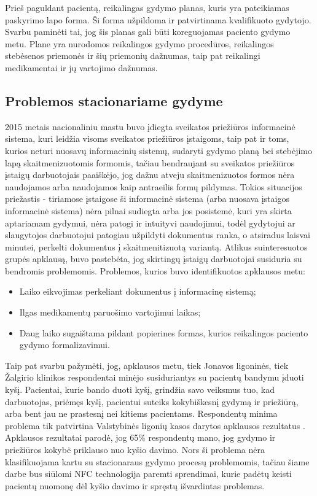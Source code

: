 Prieš paguldant pacientą, reikalingas gydymo planas, kuris yra pateikiamas paskyrimo lapo forma. Ši forma užpildoma ir patvirtinama kvalifikuoto gydytojo. Svarbu paminėti tai, jog šis planas gali būti koreguojamas paciento gydymo metu. Plane yra nurodomos reikalingos gydymo procedūros, reikalingos stebėsenos priemonės ir šių priemonių dažnumas, taip pat reikalingi medikamentai ir jų vartojimo dažnumas. 
\subsection{Problemos stacionariame gydyme}
2015 metais nacionaliniu mastu buvo įdiegta sveikatos priežiūros informacinė sistema, kuri leidžia visoms sveikatos priežiūros įstaigoms, taip pat ir toms, kurios neturi nuosavų informacinių sistemų, sudaryti gydymo planą bei stebėjimo lapą skaitmenizuotomis formomis, tačiau bendraujant su sveikatos priežiūros įstaigų darbuotojais paaiškėjo, jog dažnu atveju skaitmenizuotos formos nėra naudojamos arba naudojamos kaip antraeilis formų pildymas. Tokios situacijos priežastis - tiriamose įstaigose ši informacinė sistema (arba nuosava įstaigos informacinė sistema) nėra pilnai sudiegta arba jos posistemė, kuri yra skirta aptariamam gydymui, nėra patogi ir intuityvi naudojimui, todėl gydytojui ar slaugytojos darbuotojui patogiau užpildyti dokumentus ranka, o atsiradus laisvai minutei, perkelti dokumentus į skaitmenitizuotą variantą. Atlikus suinteresuotos grupės apklausą, buvo pastebėta, jog skirtingų įstaigų darbuotojai susiduria su bendromis problemomis. Problemos, kurios buvo identifikuotos apklausos metu: 
\begin{itemize}
    \item Laiko eikvojimas perkeliant dokumentus į informacinę sistemą;
    \item Ilgas medikamentų paruošimo vartojimui laikas;
    \item Daug laiko sugaištama pildant popierines formas, kurios reikalingos paciento gydymo formalizavimui.
\end{itemize}

Taip pat svarbu pažymėti, jog, apklausos metu, tiek Jonavos ligoninės, tiek Žalgirio klinikos respondentai minėjo susiduriantys su pacientų bandymu įduoti kyšį. Pacientai, kurie bando duoti kyšį, grindžia savo veiksmus tuo, kad darbuotojas, priėmęs kyšį, pacientui suteiks kokybiškesnį gydymą ir priežiūrą, arba bent jau ne prastesnį nei kitiems pacientams. Respondentų minima problema tik patvirtina Valstybinės ligonių kasos darytos apklausos rezultatus \cite{Kasa2016}. Apklausos rezultatai parodė, jog 65\% respondentų mano, jog gydymo ir priežiūros kokybė priklauso nuo kyšio davimo. Nors ši problema nėra klasifikuojama kartu su stacionaraus gydymo procesų problemomis, tačiau šiame darbe bus siūlomi NFC technologija paremti sprendimai, kurie padėtų keisti pacientų nuomonę dėl kyšio davimo ir spręstų išvardintas problemas.







